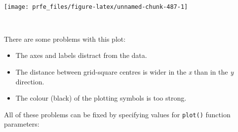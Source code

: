 \documentclass[
  12pt,
  a4paper]{book}
\newenvironment{Shaded}{\begin{snugshade}}{\end{snugshade}}
\newcommand{\AttributeTok}[1]{\textcolor[rgb]{0.77,0.63,0.00}{#1}}
\newcommand{\ConstantTok}[1]{\textcolor[rgb]{0.00,0.00,0.00}{#1}}
\newcommand{\DecValTok}[1]{\textcolor[rgb]{0.00,0.00,0.81}{#1}}
\newcommand{\FloatTok}[1]{\textcolor[rgb]{0.00,0.00,0.81}{#1}}
\newcommand{\FunctionTok}[1]{\textcolor[rgb]{0.00,0.00,0.00}{#1}}
\newcommand{\NormalTok}[1]{#1}
\newcommand{\SpecialCharTok}[1]{\textcolor[rgb]{0.00,0.00,0.00}{#1}}
\newcommand{\StringTok}[1]{\textcolor[rgb]{0.31,0.60,0.02}{#1}}
\begin{document}
~

\begin{Shaded}
\end{Shaded}

\begin{center}\texttt{[image: prfe\_files/figure-latex/unnamed-chunk-487-1]} \end{center}

~

There are some problems with this plot:

\begin{itemize}
\item
  The axes and labels distract from the data.
\item
  The distance between grid-square centres is wider in the \emph{x} than in the \emph{y} direction.
\item
  The colour (black) of the plotting symbols is too strong.
\end{itemize}

All of these problems can be fixed by specifying values for \texttt{plot()} function parameters:

~

\begin{Shaded}
\end{Shaded}
\end{document}

